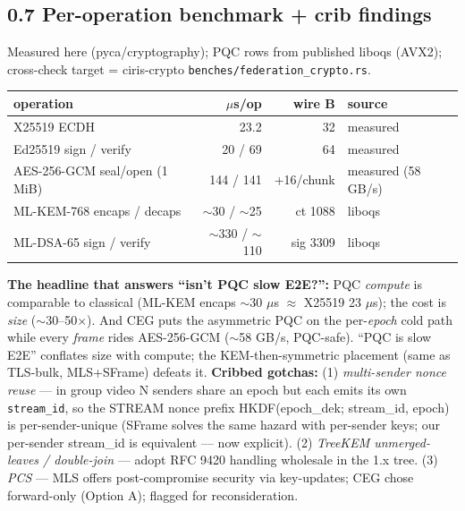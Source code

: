\documentclass[10pt]{article}
\begin{document}
\subsection*{0.7 Per-operation benchmark + crib findings}
Measured here (pyca/cryptography); PQC rows from published liboqs (AVX2);
cross-check target = ciris-crypto \texttt{benches/federation\_crypto.rs}.
\begin{center}\footnotesize
\begin{tabular}{|p{5.2cm}|r|r|l|}\hline
\textbf{operation} & \textbf{$\mu$s/op} & \textbf{wire B} & \textbf{source}\\\hline
X25519 ECDH & 23.2 & 32 & measured\\\hline
Ed25519 sign / verify & 20 / 69 & 64 & measured\\\hline
AES-256-GCM seal/open (1 MiB) & 144 / 141 & +16/chunk & measured (58 GB/s)\\\hline
ML-KEM-768 encaps / decaps & $\sim$30 / $\sim$25 & ct 1088 & liboqs\\\hline
ML-DSA-65 sign / verify & $\sim$330 / $\sim$110 & sig 3309 & liboqs\\\hline
\end{tabular}
\end{center}
\noindent\textbf{The headline that answers ``isn't PQC slow E2E?'':} PQC
\emph{compute} is comparable to classical (ML-KEM encaps $\sim$30 $\mu$s $\approx$
X25519 23 $\mu$s); the cost is \emph{size} ($\sim$30--50$\times$). And CEG puts the
asymmetric PQC on the per-\emph{epoch} cold path while every \emph{frame} rides
AES-256-GCM ($\sim$58 GB/s, PQC-safe). ``PQC is slow E2E'' conflates size with
compute; the KEM-then-symmetric placement (same as TLS-bulk, MLS+SFrame) defeats
it. \textbf{Cribbed gotchas:} (1) \emph{multi-sender nonce reuse} --- in group
video N senders share an epoch but each emits its own \texttt{stream\_id}, so the
STREAM nonce prefix HKDF(epoch\_dek; stream\_id, epoch) is per-sender-unique
(SFrame solves the same hazard with per-sender keys; our per-sender stream\_id is
equivalent --- now explicit). (2) \emph{TreeKEM unmerged-leaves / double-join} ---
adopt RFC 9420 handling wholesale in the 1.x tree. (3) \emph{PCS} --- MLS offers
post-compromise security via key-updates; CEG chose forward-only (Option A);
flagged for reconsideration.
\end{document}
